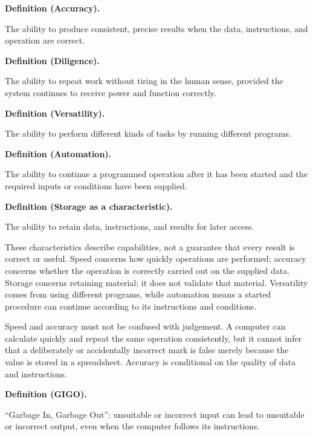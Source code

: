 \documentclass[11pt]{article}
\newenvironment{definitionbox}[1]{%
  \par\noindent\textbf{Definition (#1).}\ \itshape
}{\par\vspace{0.3em}}
\begin{document}
\begin{definitionbox}{Accuracy}
The ability to produce consistent, precise results when the data, instructions,
and operation are correct.
\end{definitionbox}

\begin{definitionbox}{Diligence}
The ability to repeat work without tiring in the human sense, provided the
system continues to receive power and function correctly.
\end{definitionbox}

\begin{definitionbox}{Versatility}
The ability to perform different kinds of tasks by running different
programs.
\end{definitionbox}

\begin{definitionbox}{Automation}
The ability to continue a programmed operation after it has been started and
the required inputs or conditions have been supplied.
\end{definitionbox}

\begin{definitionbox}{Storage as a characteristic}
The ability to retain data, instructions, and results for later access.
\end{definitionbox}

These characteristics describe capabilities, not a guarantee that every
result is correct or useful. Speed concerns how quickly operations are
performed; accuracy concerns whether the operation is correctly carried out
on the supplied data. Storage concerns retaining material; it does not
validate that material. Versatility comes from using different programs,
while automation means a started procedure can continue according to its
instructions and conditions.

Speed and accuracy must not be confused with judgement. A computer can
calculate quickly and repeat the same operation consistently, but it cannot
infer that a deliberately or accidentally incorrect mark is false merely
because the value is stored in a spreadsheet. Accuracy is conditional on the
quality of data and instructions.

\begin{definitionbox}{GIGO}
``Garbage In, Garbage Out'': unsuitable or incorrect input can lead to
unsuitable or incorrect output, even when the computer follows its
instructions.
\end{definitionbox}
\end{document}
